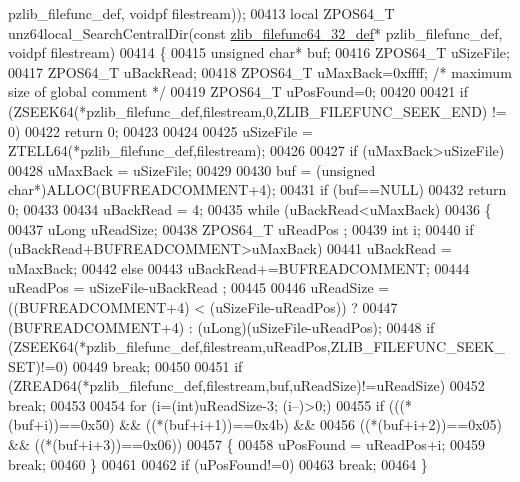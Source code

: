 \begin{DoxyCode}
      pzlib\_filefunc\_def, voidpf filestream));
00413 local ZPOS64\_T unz64local\_SearchCentralDir(\textcolor{keyword}{const} \hyperlink{structzlib__filefunc64__32__def__s}{zlib\_filefunc64\_32\_def}* 
      pzlib\_filefunc\_def, voidpf filestream)
00414 \{
00415     \textcolor{keywordtype}{unsigned} \textcolor{keywordtype}{char}* buf;
00416     ZPOS64\_T uSizeFile;
00417     ZPOS64\_T uBackRead;
00418     ZPOS64\_T uMaxBack=0xffff; \textcolor{comment}{/* maximum size of global comment */}
00419     ZPOS64\_T uPosFound=0;
00420 
00421     \textcolor{keywordflow}{if} (ZSEEK64(*pzlib\_filefunc\_def,filestream,0,ZLIB\_FILEFUNC\_SEEK\_END) != 0)
00422         \textcolor{keywordflow}{return} 0;
00423 
00424 
00425     uSizeFile = ZTELL64(*pzlib\_filefunc\_def,filestream);
00426 
00427     \textcolor{keywordflow}{if} (uMaxBack>uSizeFile)
00428         uMaxBack = uSizeFile;
00429 
00430     buf = (\textcolor{keywordtype}{unsigned} \textcolor{keywordtype}{char}*)ALLOC(BUFREADCOMMENT+4);
00431     \textcolor{keywordflow}{if} (buf==NULL)
00432         \textcolor{keywordflow}{return} 0;
00433 
00434     uBackRead = 4;
00435     \textcolor{keywordflow}{while} (uBackRead<uMaxBack)
00436     \{
00437         uLong uReadSize;
00438         ZPOS64\_T uReadPos ;
00439         \textcolor{keywordtype}{int} i;
00440         \textcolor{keywordflow}{if} (uBackRead+BUFREADCOMMENT>uMaxBack)
00441             uBackRead = uMaxBack;
00442         \textcolor{keywordflow}{else}
00443             uBackRead+=BUFREADCOMMENT;
00444         uReadPos = uSizeFile-uBackRead ;
00445 
00446         uReadSize = ((BUFREADCOMMENT+4) < (uSizeFile-uReadPos)) ?
00447                      (BUFREADCOMMENT+4) : (uLong)(uSizeFile-uReadPos);
00448         \textcolor{keywordflow}{if} (ZSEEK64(*pzlib\_filefunc\_def,filestream,uReadPos,ZLIB\_FILEFUNC\_SEEK\_SET)!=0)
00449             \textcolor{keywordflow}{break};
00450 
00451         \textcolor{keywordflow}{if} (ZREAD64(*pzlib\_filefunc\_def,filestream,buf,uReadSize)!=uReadSize)
00452             \textcolor{keywordflow}{break};
00453 
00454         \textcolor{keywordflow}{for} (i=(\textcolor{keywordtype}{int})uReadSize-3; (i--)>0;)
00455             \textcolor{keywordflow}{if} (((*(buf+i))==0x50) && ((*(buf+i+1))==0x4b) &&
00456                 ((*(buf+i+2))==0x05) && ((*(buf+i+3))==0x06))
00457             \{
00458                 uPosFound = uReadPos+i;
00459                 \textcolor{keywordflow}{break};
00460             \}
00461 
00462         \textcolor{keywordflow}{if} (uPosFound!=0)
00463             \textcolor{keywordflow}{break};
00464     \}

\end{DoxyCode}
